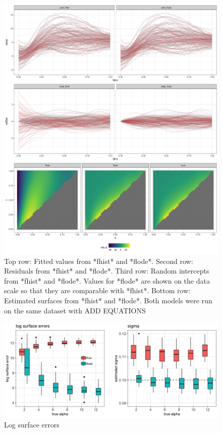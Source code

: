 \documentclass[preprint]{JASA}
\begin{document}
\begin{figure}
\includegraphics[width=\reprintcolumnwidth]{figs/fig_sim_results-1} \caption{Top row: Fitted values from *fhist* and *flode*. Second row: Residuals from *fhist* and *flode*.  Third row: Random intercepts from *fhist* and *flode*. Values for *flode* are shown on the data scale so that they are comparable with *fhist*. Bottom row: Estimated surfaces from *fhist* and *flode*. Both models were run on the same dataset with ADD EQUATIONS}\label{fig:sim_results}
\end{figure}

\begin{figure}
\includegraphics[width=\reprintcolumnwidth]{figs/fig_sim_surfaceErr-1} \caption{Log surface errors}\label{fig:sim_surfaceErr}
\end{figure}
\end{document}
